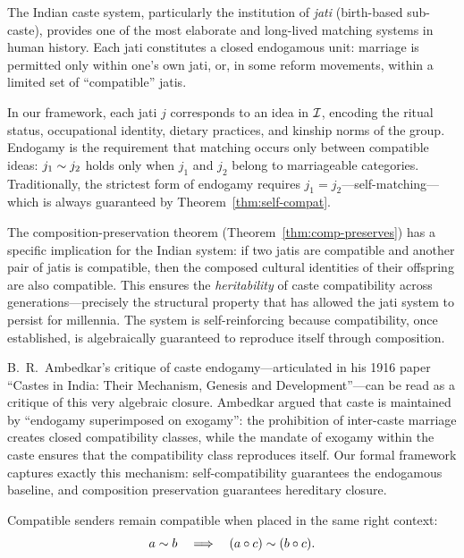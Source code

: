 \begin{example}
The Indian caste system, particularly the institution of
\emph{jati} (birth-based sub-caste), provides one of the most elaborate
and long-lived matching systems in human history.  Each jati constitutes a
closed endogamous unit: marriage is permitted only within one's own jati,
or, in some reform movements, within a limited set of ``compatible'' jatis.

In our framework, each jati $j$ corresponds to an idea in $\mathcal{I}$, encoding
the ritual status, occupational identity, dietary practices, and kinship
norms of the group.  Endogamy is the requirement that matching occurs only
between compatible ideas: $j_1 \sim j_2$ holds only when $j_1$ and $j_2$
belong to marriageable categories.  Traditionally, the strictest form of
endogamy requires $j_1 = j_2$---self-matching---which is always guaranteed
by Theorem~\ref{thm:self-compat}.

The composition-preservation theorem (Theorem~\ref{thm:comp-preserves})
has a specific implication for the Indian system: if two jatis are
compatible and another pair of jatis is compatible, then the composed
cultural identities of their offspring are also compatible.  This ensures
the \emph{heritability} of caste compatibility across generations---precisely
the structural property that has allowed the jati system to persist for
millennia.  The system is self-reinforcing because compatibility, once
established, is algebraically guaranteed to reproduce itself through
composition.

B.\ R.\ Ambedkar's critique of caste endogamy---articulated in his 1916
paper ``Castes in India: Their Mechanism, Genesis and Development''---can be
read as a critique of this very algebraic closure.  Ambedkar argued that
caste is maintained by ``endogamy superimposed on exogamy'': the
prohibition of inter-caste marriage creates closed compatibility classes,
while the mandate of exogamy within the caste ensures that the compatibility
class reproduces itself.  Our formal framework captures exactly this
mechanism: self-compatibility guarantees the endogamous baseline, and
composition preservation guarantees hereditary closure.
\end{example}

\begin{theorem}
\label{thm:right-context}
Compatible senders remain compatible when placed in the same right context:
\[
  a \sim b
  \quad\Longrightarrow\quad
  (a \circ c) \sim (b \circ c).
\]
\end{theorem}

